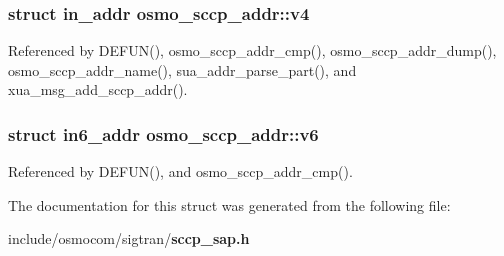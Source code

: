 \subsubsection[{v4}]{\setlength{\rightskip}{0pt plus 5cm}struct in\+\_\+addr osmo\+\_\+sccp\+\_\+addr\+::v4}\label{structosmo__sccp__addr_a0f8e855dab0a6d9f058fc54d7584086e}


Referenced by D\+E\+F\+U\+N(), osmo\+\_\+sccp\+\_\+addr\+\_\+cmp(), osmo\+\_\+sccp\+\_\+addr\+\_\+dump(), osmo\+\_\+sccp\+\_\+addr\+\_\+name(), sua\+\_\+addr\+\_\+parse\+\_\+part(), and xua\+\_\+msg\+\_\+add\+\_\+sccp\+\_\+addr().

\subsubsection[{v6}]{\setlength{\rightskip}{0pt plus 5cm}struct in6\+\_\+addr osmo\+\_\+sccp\+\_\+addr\+::v6}\label{structosmo__sccp__addr_af7e421df8b698ac40887acc885bec730}


Referenced by D\+E\+F\+U\+N(), and osmo\+\_\+sccp\+\_\+addr\+\_\+cmp().



The documentation for this struct was generated from the following file\+:\begin{DoxyCompactItemize}
\item 
include/osmocom/sigtran/{\bf sccp\+\_\+sap.\+h}\end{DoxyCompactItemize}
